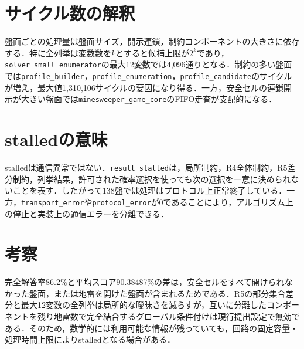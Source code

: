 \section{サイクル数の解釈}
盤面ごとの処理量は盤面サイズ，開示連鎖，制約コンポーネントの大きさに依存する．特に全列挙は変数数を\(k\)とすると候補上限が\(2^k\)であり，\texttt{solver\_small\_enumerator}の最大12変数では4,096通りとなる．制約の多い盤面では\texttt{profile\_builder}，\texttt{profile\_enumeration}，\texttt{profile\_candidate}のサイクルが増え，最大値1,310,106サイクルの要因になり得る．一方，安全セルの連鎖開示が大きい盤面では\texttt{minesweeper\_game\_core}のFIFO走査が支配的になる．

\section{stalledの意味}
stalledは通信異常ではない．\texttt{result\_stalled}は，局所制約，R4全体制約，R5差分制約，列挙結果，許可された確率選択を使っても次の選択を一意に決められないことを表す．したがって138盤では処理はプロトコル上正常終了している．一方，\texttt{transport\_error}や\texttt{protocol\_error}が0であることにより，アルゴリズム上の停止と実装上の通信エラーを分離できる．

\section{考察}
完全解答率86.2\%と平均スコア90.38487\%の差は，安全セルをすべて開けられなかった盤面，または地雷を開けた盤面が含まれるためである．R5の部分集合差分と最大12変数の全列挙は局所的な曖昧さを減らすが，互いに分離したコンポーネントを残り地雷数で完全結合するグローバル条件付けは現行提出設定で無効である．そのため，数学的には利用可能な情報が残っていても，回路の固定容量・処理時間上限によりstalledとなる場合がある．
